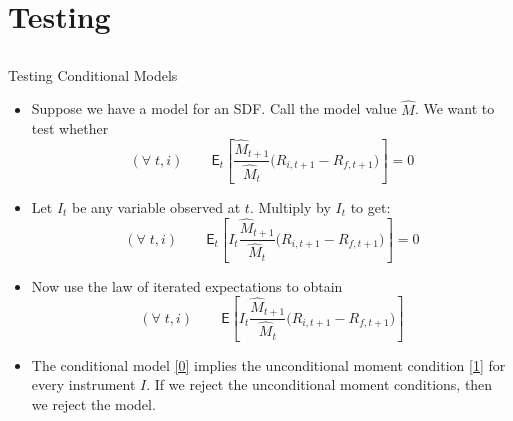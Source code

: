 \documentclass[10pt]{beamer}
\newcommand{\bi}{\begin{itemize}}
\newcommand{\ei}{\end{itemize}}
\newcommand{\im}{\item}
\newcommand{\mye}{\ensuremath{\mathsf{E}}}
\begin{document}
\section{Testing}\subsection{}
\begin{frame}{Testing Conditional Models}
    \bi \im
Suppose we have a model for an SDF.  Call the model value $\hat M$.  We want to test whether
\begin{equation}\label{0}\tag{$\star$}
(\forall\;t, i) \qquad \mye_t\left[\frac{\hat M_{t+1}}{\hat M_t}\bigg(R_{i,t+1} - R_{f, t+1}\bigg)\right] = 0
\end{equation}
\im Let $I_t$ be any variable observed at $t$.  Multiply by $I_t$ to get:
$$(\forall\;t, i) \qquad \mye_t\left[I_t\frac{\hat M_{t+1}}{\hat M_t}\bigg(R_{i,t+1} - R_{f, t+1}\bigg)\right] =0$$
\im Now use the law of iterated expectations to obtain
\begin{equation}\label{1}\tag{$\star\star$}
(\forall\;t, i) \qquad \mye\left[I_t\frac{\hat M_{t+1}}{\hat M_t}\bigg(R_{i,t+1} - R_{f, t+1}\bigg)\right]
\end{equation}
\im 
The conditional model \eqref{0} implies the unconditional moment condition \eqref{1} for every \alert{instrument} $I$.  If we reject the unconditional moment conditions, then we reject the model. 
\ei 
\end{frame}
\end{document}
